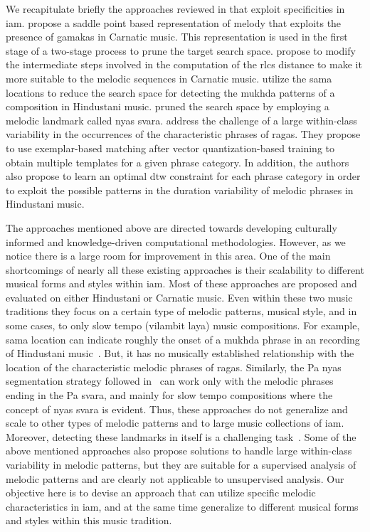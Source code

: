 We recapitulate briefly the approaches reviewed in  that exploit specificities in \gls{iam}.  \cite{Ishwar2013} propose a saddle point based representation of melody that exploits the presence of \glspl{gamaka} in Carnatic music. This representation is used in the first stage of a two-stage process to prune the target search space. \cite{dutta2014modified} propose to modify the intermediate steps involved in the computation of the \gls{rlcs} distance to make it more suitable to the melodic sequences in Carnatic music.  \cite{Ross2012b} utilize the \gls{sama} locations to reduce the search space for detecting the \gls{mukhda} patterns of a composition in Hindustani music. \cite{Ross2012} pruned the search space by employing a melodic landmark called \gls{nyas} \gls{svara}. \cite{Rao2014} address the challenge of a large within-class variability in the occurrences of the characteristic phrases of \glspl{raga}. They propose to use exemplar-based matching after vector quantization-based training to obtain multiple templates for a given phrase category. In addition, the authors also propose to learn an optimal \gls{dtw} constraint for each phrase category in order to exploit the possible patterns in the duration variability of melodic phrases in Hindustani music. 

The approaches mentioned above are directed towards developing culturally informed and knowledge-driven computational methodologies. However, as we notice there is a large room for improvement in this area. One of the main shortcomings of nearly all these existing approaches is their scalability to different musical forms and styles within \gls{iam}. Most of these approaches are proposed and evaluated on either Hindustani or Carnatic music. Even within these two music traditions they focus on a certain type of melodic patterns, musical style, and in some cases, to only slow tempo (vilambit laya) music compositions. For example, \gls{sama} location can indicate roughly the onset of a \gls{mukhda} phrase in an recording of Hindustani music~\citep{Ross2012b}. But, it has no musically established relationship with the location of the characteristic melodic phrases of \glspl{raga}. Similarly, the Pa \gls{nyas} segmentation strategy followed in~\cite{Ross2012} can work only with the melodic phrases ending in the Pa \gls{svara}, and mainly for slow tempo compositions where the concept of \gls{nyas} \gls{svara} is evident. Thus, these approaches do not generalize and scale to other types of melodic patterns and to large music collections of \gls{iam}. Moreover, detecting these landmarks in itself is a challenging task~\citep{srinivasamurthy2014supervised,gulati2014Landmark}. Some of the above mentioned approaches also propose solutions to handle large within-class variability in melodic patterns, but they are suitable for a supervised analysis of melodic patterns and are clearly not applicable to unsupervised analysis. Our objective here is to devise an approach that can utilize specific melodic characteristics in \gls{iam}, and at the same time generalize to different musical forms and styles within this music tradition.

